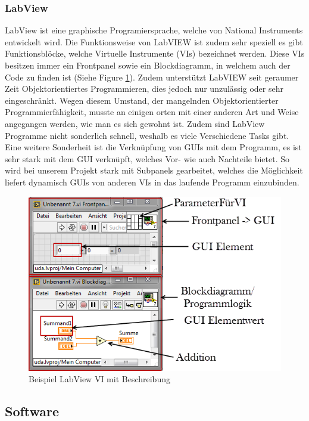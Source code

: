\documentclass[10pt]{scrartcl}
\begin{document}
\subsubsection{LabView}
LabView ist eine graphische Programiersprache, welche von National Instruments entwickelt wird. Die Funktionsweise von LabVIEW ist zudem sehr speziell es gibt Funktionsblöcke, welche Virtuelle Instrumente (VIs) bezeichnet werden. Diese VIs besitzen immer ein Frontpanel sowie ein Blockdiagramm, in welchem auch der Code zu finden ist (Siehe Figure \ref{fig:LabViewExample}). Zudem unterstützt LabVIEW seit geraumer Zeit Objektorientiertes Programmieren, dies jedoch nur unzulässig oder sehr eingeschränkt.
\newline
Wegen diesem Umstand, der mangelnden Objektorientierter Programmierfähigkeit, musste an einigen orten mit einer anderen Art und Weise angegangen werden, wie man es sich gewohnt ist. Zudem sind LabView Programme nicht sonderlich schnell, weshalb es viele Verschiedene Tasks gibt.
\newline
Eine weitere Sonderheit ist die Verknüpfung von GUIs mit dem Programm, es ist sehr stark mit dem GUI verknüpft, welches Vor- wie auch Nachteile bietet. So wird bei unserem Projekt stark mit Subpanels gearbeitet, welches die Möglichkeit liefert dynamisch GUIs von anderen VIs in das laufende Programm einzubinden.
\begin{figure}[htbp] 
	\centering
	\includegraphics[height=0.3\textheight]{LabVIEWExample}
	\caption{Beispiel LabView VI mit Beschreibung}
	\label{fig:LabViewExample}
\end{figure}
\subsection{Software}
\end{document}
